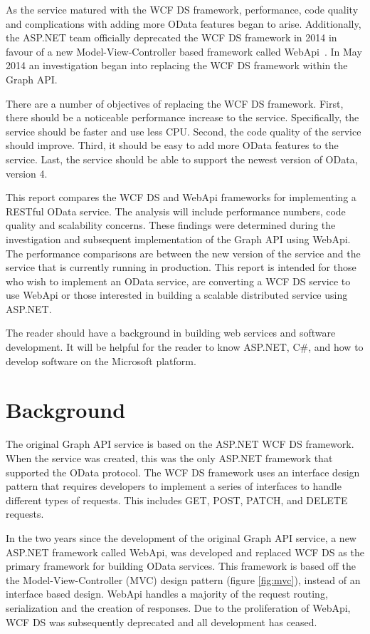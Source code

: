 \documentclass[se]{uw-wkrpt}
\begin{document}
As the service matured with the WCF DS framework, performance, code quality and complications with adding more OData features began to arise. Additionally, the ASP.NET team officially deprecated the WCF DS framework in 2014 in favour of a new Model-View-Controller based framework called WebApi~\cite{ref:wcfds}. In May 2014 an investigation began into replacing the WCF DS framework within the Graph API.

There are a number of objectives of replacing the WCF DS framework. First, there should be a noticeable performance increase to the service. Specifically, the service should be faster and use less CPU. Second, the code quality of the service should improve. Third, it should be easy to add more OData features to the service. Last, the service should be able to support the newest version of OData, version 4. 

This report compares the WCF DS and WebApi frameworks for implementing a RESTful OData service. The analysis will include performance numbers, code quality and scalability concerns. These findings were determined during the investigation and subsequent implementation of the Graph API using WebApi. The performance comparisons are between the new version of the service and the service that is currently running in production. This report is intended for those who wish to implement an OData service, are converting a WCF DS service to use WebApi or those interested in building a scalable distributed service using ASP.NET.

The reader should have a background in building web services and software development. It will be helpful for the reader to know ASP.NET, C\#, and how to develop software on the Microsoft platform.

\section{Background}

The original Graph API service is based on the ASP.NET WCF DS framework. When the service was created, this was the only ASP.NET framework that supported the OData protocol. The WCF DS framework uses an interface design pattern that requires developers to implement a series of interfaces to handle different types of requests. This includes GET, POST, PATCH, and DELETE requests.

In the two years since the development of the original Graph API service, a new ASP.NET framework called WebApi, was developed and replaced WCF DS as the primary framework for building OData services. This framework is based off the the Model-View-Controller (MVC) design pattern (figure \ref{fig:mvc}), instead of an interface based design. WebApi handles a majority of the request routing, serialization and the creation of responses. Due to the proliferation of WebApi, WCF DS was subsequently deprecated and all development has ceased.
\end{document}
